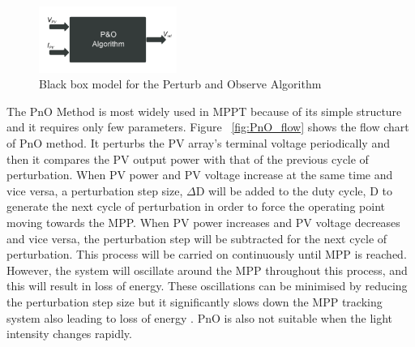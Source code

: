 {    \begin{figure}[H]
       \begin{center}
       \includegraphics[width=0.4\textwidth]{images/PnO_block}
       \caption{ Black box model for the Perturb and Observe Algorithm }
       \label{fig:PnO_block}
       \end{center}
       \end{figure}
       
  The \ac{PnO} Method is most widely used in \ac{MPPT} because of  its simple structure and it requires only few parameters. Figure ~\ref{fig:PnO_flow}  shows the flow chart of \ac{PnO} method. It perturbs the PV array's terminal voltage periodically and then it compares the PV output power with that of the previous cycle of perturbation. When PV power and PV voltage increase at the same time and vice versa, a perturbation step size, ${\Delta}$D will be added to the duty cycle, D to generate the next cycle of   perturbation in order to force the operating point moving towards the \ac{MPP}. When PV power increases and PV voltage decreases and vice versa, the perturbation step will be subtracted for the next cycle of perturbation. This process will be carried on continuously until \ac{MPP} is reached. However, the system will oscillate around the \ac{MPP} throughout this process, and this will result in loss of energy. These oscillations can be minimised by reducing the perturbation step size but it significantly slows down the \ac{MPP} tracking system also leading to loss of energy \cite{ngan2011study}. \ac{PnO} is also not suitable when the light intensity changes rapidly. \\ %
  
}
